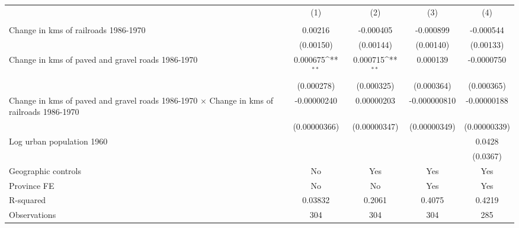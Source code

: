 {
\def\sym#1{\ifmmode^{#1}\else\(^{#1}\)\fi}
\begin{tabular}{l*{4}{c}}
\hline\hline
                &\multicolumn{1}{c}{(1)}&\multicolumn{1}{c}{(2)}&\multicolumn{1}{c}{(3)}&\multicolumn{1}{c}{(4)}\\
                &\multicolumn{1}{c}{}&\multicolumn{1}{c}{}&\multicolumn{1}{c}{}&\multicolumn{1}{c}{}\\
\hline
Change in kms of railroads 1986-1970&  0.00216         &-0.000405         &-0.000899         &-0.000544         \\
                &(0.00150)         &(0.00144)         &(0.00140)         &(0.00133)         \\
[1em]
Change in kms of paved and gravel roads 1986-1970& 0.000675\sym{**} & 0.000715\sym{**} & 0.000139         &-0.0000750         \\
                &(0.000278)         &(0.000325)         &(0.000364)         &(0.000365)         \\
[1em]
Change in kms of paved and gravel roads 1986-1970 $\times$ Change in kms of railroads 1986-1970&-0.00000240         &0.00000203         &-0.000000810         &-0.00000188         \\
                &(0.00000366)         &(0.00000347)         &(0.00000349)         &(0.00000339)         \\
[1em]
Log urban population 1960&                  &                  &                  &   0.0428         \\
                &                  &                  &                  & (0.0367)         \\
\hline
Geographic controls&       No         &      Yes         &      Yes         &      Yes         \\
Province FE     &       No         &       No         &      Yes         &      Yes         \\
R-squared       &  0.03832         &   0.2061         &   0.4075         &   0.4219         \\
Observations    &      304         &      304         &      304         &      285         \\
\hline\hline
\end{tabular}
}
